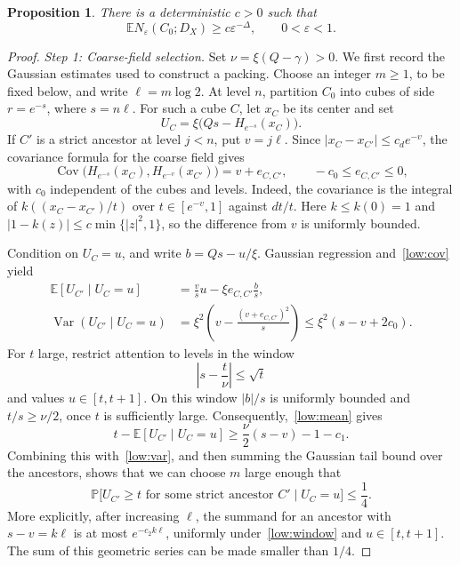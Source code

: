 \documentclass[11pt,letterpaper]{article}
\newcommand{\E}{\mathbb E}
\renewcommand{\P}{\mathbb P}
\newcommand{\eps}{\varepsilon}
\newtheorem{proposition}[theorem]{Proposition}
\theoremstyle{definition}
\theoremstyle{remark}
\numberwithin{equation}{section}
\begin{document}
\begin{proposition}\label{low:lower}
There is a deterministic $c>0$ such that
\begin{equation*}
    \E N_\eps(C_0;D_X)\ge c\eps^{-\Delta},
    \qquad 0<\eps<1.
\end{equation*}
\end{proposition}

\begin{proof}
\emph{Step 1: Coarse-field selection.}
Set $\nu=\xi(Q-\gamma)>0$. We first record the Gaussian estimates used to construct a packing. Choose an integer $m\ge1$, to be fixed below, and write $\ell=m\log 2$. At level $n$, partition $C_0$ into cubes of side $r=e^{-s}$, where $s=n\ell$. For such a cube $C$, let $x_C$ be its center and set
\begin{equation*}
    U_C=\xi\bigl(Qs-H_{e^{-s}}(x_C)\bigr).
\end{equation*}
If $C'$ is a strict ancestor at level $j<n$, put $v=j\ell$. Since $|x_C-x_{C'}|\le c_d e^{-v}$, the covariance formula for the coarse field gives
\begin{equation}\label{low:cov}
    \operatorname{Cov}\bigl(H_{e^{-s}}(x_C),H_{e^{-v}}(x_{C'})\bigr)
       =v+e_{C,C'},\qquad -c_0\le e_{C,C'}\le0,
\end{equation}
with $c_0$ independent of the cubes and levels. Indeed, the covariance is the integral of $k((x_C-x_{C'})/t)$ over $t\in[e^{-v},1]$ against $dt/t$. Here $k\le k(0)=1$ and $|1-k(z)|\le c\min\{|z|^2,1\}$, so the difference from $v$ is uniformly bounded.

Condition on $U_C=u$, and write $b=Qs-u/\xi$. Gaussian regression and~\eqref{low:cov} yield
\begin{align}
 \E[U_{C'}\mid U_C=u]
   &=\frac{v}{s}u-\xi e_{C,C'}\frac{b}{s},\label{low:mean}\\
 \operatorname{Var}(U_{C'}\mid U_C=u)
   &=\xi^2\left(v-\frac{(v+e_{C,C'})^2}{s}\right)
     \le\xi^2(s-v+2c_0).\label{low:var}
\end{align}
For $t$ large, restrict attention to levels in the window
\begin{equation}\label{low:window}
    \left|s-\frac{t}{\nu}\right|\le\sqrt t
\end{equation}
and values $u\in[t,t+1]$. On this window $|b|/s$ is uniformly bounded and $t/s\ge\nu/2$, once $t$ is sufficiently large. Consequently,~\eqref{low:mean} gives
\begin{equation*}
 t-\E[U_{C'}\mid U_C=u]
      \ge \frac\nu2(s-v)-1-c_1.
\end{equation*}
Combining this with~\eqref{low:var}, and then summing the Gaussian tail bound over the ancestors, shows that we can choose $m$ large enough that
\begin{equation}\label{low:ancestors}
 \P\bigl[U_{C'}\ge t\text{ for some strict ancestor }C'
              \mid U_C=u\bigr]\le\frac14.
\end{equation}
More explicitly, after increasing $\ell$, the summand for an ancestor with $s-v=k\ell$ is at most $e^{-c_2k\ell}$, uniformly under~\eqref{low:window} and $u\in[t,t+1]$. The sum of this geometric series can be made smaller than $1/4$.


\end{proof}
\end{document}
